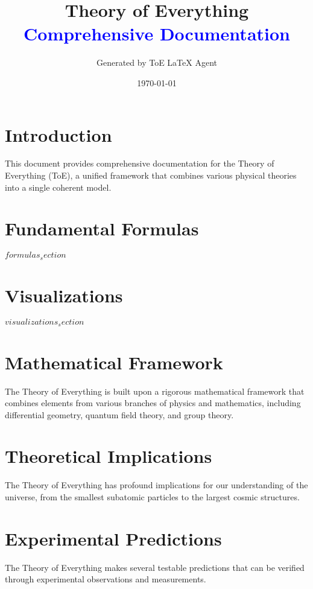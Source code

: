 \documentclass{article}
\title{\Huge\textbf{Theory of Everything}\\
\Large\textcolor{blue}{Comprehensive Documentation}}
\author{Generated by ToE LaTeX Agent}
\date{\today}
\begin{document}
\maketitle
\tableofcontents
\newpage

\section{Introduction}
This document provides comprehensive documentation for the Theory of Everything (ToE), a unified framework that combines various physical theories into a single coherent model.

\section{Fundamental Formulas}
$formulas_section$

\section{Visualizations}
$visualizations_section$

\section{Mathematical Framework}
The Theory of Everything is built upon a rigorous mathematical framework that combines elements from various branches of physics and mathematics, including differential geometry, quantum field theory, and group theory.

\section{Theoretical Implications}
The Theory of Everything has profound implications for our understanding of the universe, from the smallest subatomic particles to the largest cosmic structures.

\section{Experimental Predictions}
The Theory of Everything makes several testable predictions that can be verified through experimental observations and measurements.
\end{document}
